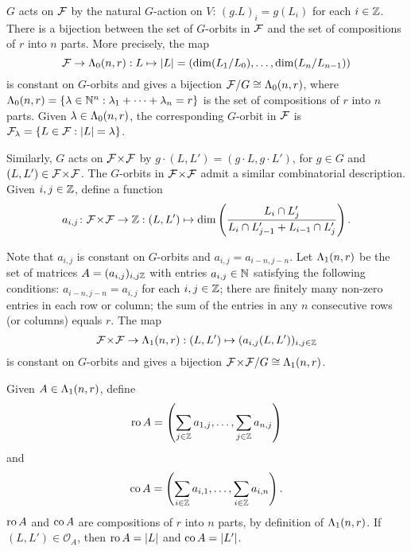 \documentclass[a4paper, 11pt]{report}
\begin{document}
$G$ acts on $\mathcal{F}$ by the natural $G$-action on $V$: $(g.L)_i = g(L_i)$ for each $i\in\mathbb{Z}$. There is a bijection between the set of $G$-orbits in $\mathcal{F}$ and the set of compositions of $r$ into $n$ parts. More precisely, the map
\begin{equation*}
\mathcal{F}\to\Lambda_0(n,r):L\mapsto |L|=\left(\dim(L_1/L_0),\ldots,\dim(L_n/L_{n-1})\right)
\end{equation*}
is constant on $G$-orbits and gives a bijection $\mathcal{F}/G\cong\Lambda_0(n,r)$, where $\Lambda_0(n,r)=\{\lambda\in\mathbb{N}^n: \lambda_1+\cdots +\lambda_n = r\}$ is the set of compositions of $r$ into $n$ parts. Given $\lambda\in\Lambda_0(n,r)$, the corresponding $G$-orbit in $\mathcal{F}$ is $\mathcal{F}_\lambda=\{L\in\mathcal{F}:|L|=\lambda\}$.

Similarly, $G$ acts on ${\mathcal{F}\!\times\!\mathcal{F}}$ by $g\cdot (L,L') = (g\cdot L,g\cdot L')$, for $g\in G$ and $(L,L')\in{\mathcal{F}\!\times\!\mathcal{F}}$. The $G$-orbits in ${\mathcal{F}\!\times\!\mathcal{F}}$ admit a similar combinatorial description. Given $i,j\in\mathbb{Z}$, define a function
\begin{equation*}
a_{i,j}\colon{\mathcal{F}\!\times\!\mathcal{F}}\to\mathbb{Z}:(L,L')\mapsto \dim\left(\frac{L_i\cap L_j'}{L_i\cap L_{j-1}' + L_{i-1}\cap L_j'}\right).
\end{equation*}

Note that $a_{i,j}$ is constant on $G$-orbits and $a_{i,j}=a_{i-n,j-n}$. Let $\Lambda_1(n,r)$ be the set of matrices $A=(a_{i,j})_{i,j\mathbb{Z}}$ with entries $a_{i,j}\in\mathbb{N}$ satisfying the following conditions: $a_{i-n,j-n} = a_{i,j}$ for each $i,j\in\mathbb{Z}$; there are finitely many non-zero entries in each row or column; the sum of the entries in any $n$ consecutive rows (or columns) equals $r$. The map
\begin{equation*}
{\mathcal{F}\!\times\!\mathcal{F}}\to\Lambda_1(n,r):(L,L')\mapsto (a_{i,j}(L,L'))_{i,j\in\mathbb{Z}}
\end{equation*}
is constant on $G$-orbits and gives a bijection ${\mathcal{F}\!\times\!\mathcal{F}}/G\cong\Lambda_1(n,r)$.


Given $A\in\Lambda_1(n,r)$, define
\begin{equation*}
\operatorname{ro}{A} = \left( \sum_{j\in\mathbb{Z}}a_{1,j}, \ldots, \sum_{j\in\mathbb{Z}} a_{n,j}\right)
\end{equation*}
and
\begin{equation*}
\operatorname{co}{A} = \left( \sum_{i\in\mathbb{Z}} a_{i,1}, \ldots, \sum_{i\in\mathbb{Z}} a_{i,n}\right).
\end{equation*}
$\operatorname{ro}{A}$ and $\operatorname{co}{A}$ are compositions of $r$ into $n$ parts, by definition of $\Lambda_1(n,r)$. If $(L,L')\in\mathcal{O}_A$, then $\operatorname{ro}{A}=|L|$ and $\operatorname{co}{A} = |L'|$.
\end{document}
